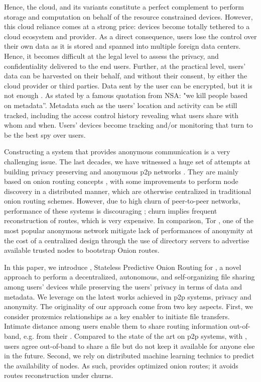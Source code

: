 Hence, the cloud, and its variants constitute a perfect complement
to perform storage and computation on behalf of the resource
constrained devices. However, this cloud reliance comes at a strong price:
devices become totally tethered to a cloud ecosystem and provider. As
a direct consequence, users lose the control over their own data as it is
stored and spanned into multiple foreign data centers. Hence, it becomes difficult at 
the legal level to assess the privacy, and
confidentiality delivered to the end users. Further, at the practical
level, users' data can be harvested on their behalf, and without their
consent, by either the cloud provider or third parties.
Data sent by the user can be encrypted, but it is not enough
\cite{granick_2017, HooffLZZ15, HarnikPS10}.  As stated by a famous quotation from
NSA: "we kill people based on metadata''. Metadata such as the users'
location and activity can be still tracked, including the access
control history revealing what users share with whom and when.
Users’ devices become tracking and/or monitoring \squad that turn to
be the best spy over users. 

Constructing a system that provides anonymous communication is a very
challenging issue. The last decades, we have witnessed a
 huge set of attempts at building privacy preserving and anonymous p2p
 networks \cite{Clarke:2001, Gnunet2002, Freedman:2002, Nambiar:2006,
   Rennhard:2002}. They are mainly based on onion
 routing concepts \cite{Chaum:1981}, with some improvements to perform node
 discovery in a distributed manner, which are otherwise
centralized in traditional onion routing schemes. However, due to high
churn of peer-to-peer networks, performance of these systems is
discouraging \cite{LeBlond:2013}; churn implies frequent
reconstruction of routes, which is very expensive. In comparison, Tor
\cite{Dingledine:2004}, one of the most popular anonymous network
mitigate lack of performances of anonymity at the cost of a
centralized design through the use of directory
servers to advertise available trusted nodes to bootstrap Onion
routes. 

In this paper, we introduce \name, Stateless Predictive Onion Routing
for \squad, a novel approach to perform a decentralized, autonomous,
and self-organizing file sharing among users' devices while preserving the users’ privacy
in terms of data and metadata. We leverage on the latest works achieved
in p2p systems, privacy and anonymity. The originality of our approach come
from two key aspects. First, we consider proxemics relationships as a key enabler to initiate file
transfers. Intimate distance among users enable them to share
routing information out-of-band, e.g. from their
\squad. Compared to the state of the art on p2p systems, with \name,
users agree out-of-band to share a file but
do not keep it available for anyone else in the future. Second, we
rely on distributed machine learning technics to predict the
availability of nodes. As such, \name provides optimized onion routes; it avoids routes
reconstruction under churns.

